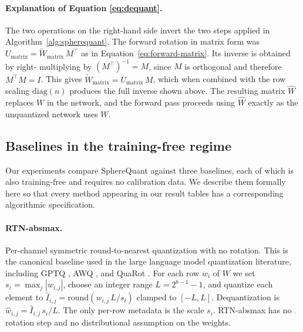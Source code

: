 \paragraph{Explanation of Equation \ref{eq:dequant}.}
The two operations on the right-hand side invert the two steps applied in
Algorithm~\ref{alg:spherequant}. The forward rotation in matrix form was
$U_{\text{matrix}} = \widetilde{W}_{\text{matrix}}\, M^\top$ as in
Equation~\ref{eq:forward-matrix}. Its inverse is obtained by right-
multiplying by $(M^\top)^{-1} = M$, since $M$ is orthogonal and therefore
$M^\top M = I$. This gives
$\widetilde{W}_{\text{matrix}} = U_{\text{matrix}}\, M$, which when combined
with the row scaling $\mathrm{diag}(n)$ produces the full inverse shown
above. The resulting matrix $\widehat{W}$ replaces $W$ in the network, and
the forward pass proceeds using $\widehat{W}$ exactly as the unquantized
network uses $W$.

\subsection{Baselines in the training-free regime}
\label{sec:method-baselines}

Our experiments compare SphereQuant against three baselines, each of which is also
training-free and requires no calibration data. We describe them formally
here so that every method appearing in our result tables has a
corresponding algorithmic specification.

\paragraph{RTN-absmax.}
Per-channel symmetric round-to-nearest quantization with no rotation. This
is the canonical baseline used in the large language model quantization
literature, including GPTQ \citep{frantar2022gptq}, AWQ
\citep{lin2023awq}, and QuaRot \citep{ashkboos2024quarot}. For each row
$w_i$ of $W$ we set $s_i = \max_j |w_{i,j}|$, choose an integer range
$L = 2^{b-1} - 1$, and quantize each element to
$\widehat{I}_{i,j} = \mathrm{round}(w_{i,j}\, L / s_i)$ clamped to
$[-L, L]$. Dequantization is
$\widehat{w}_{i,j} = \widehat{I}_{i,j}\, s_i / L$. The only per-row metadata
is the scale $s_i$. RTN-absmax has no rotation step and no distributional
assumption on the weights.

